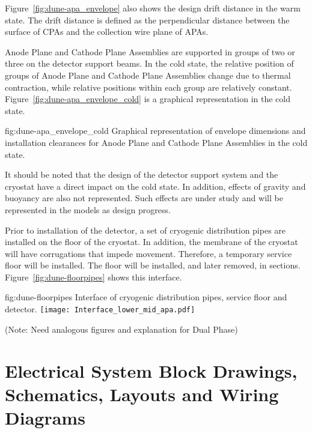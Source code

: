 Figure~\ref{fig:dune-apa_envelope} also shows the design drift
distance in the warm state. The drift distance is defined as the
perpendicular distance between the surface of CPAs and the collection
wire plane of APAs.


Anode Plane and Cathode Plane Assemblies are supported in groups of
two or three on the detector support beams.  In the cold state, the
relative position of groups of Anode Plane and Cathode Plane
Assemblies change due to thermal contraction, while relative positions
within each group are relatively
constant. Figure~\ref{fig:dune-apa_envelope_cold} is a graphical
representation in the cold state.
\begin{dunefigure}{fig:dune-apa_envelope_cold} {Graphical
    representation of envelope dimensions and installation clearances
    for Anode Plane and Cathode Plane Assemblies in the cold state.}
\end{dunefigure}

It should be noted that the design of the detector support system and
the cryostat have a direct impact on the cold state. In addition,
effects of gravity and buoyancy are also not represented. Such effects
are under study and will be represented in the models as design
progress.

Prior to installation of the detector, a set of cryogenic distribution
pipes are installed on the floor of the cryostat. In addition, the
membrane of the cryostat will have corrugations that impede
movement. Therefore, a temporary service floor will be installed. The
floor will be installed, and later removed, in
sections. Figure~\ref{fig:dune-floorpipes} shows this interface.

\begin{dunefigure}{fig:dune-floorpipes} 
{Interface of cryogenic distribution pipes, service floor and detector.}
  \texttt{[image: Interface\_lower\_mid\_apa.pdf]}
\end{dunefigure}


(Note: Need analogous figures and explanation for Dual Phase)


\section{Electrical System Block Drawings, Schematics, Layouts and Wiring Diagrams}
\label{sec:fdsp-coord-electrical}


